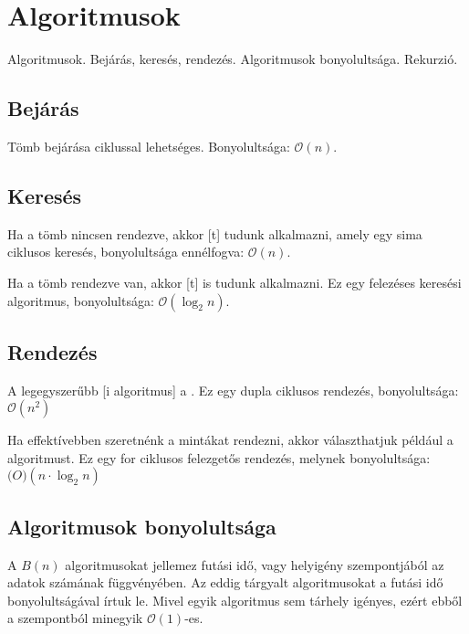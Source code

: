 \documentclass[../../main.tex]{subfiles}
\begin{document}
\section{Algoritmusok}

\begin{fulltheorem}
  Algoritmusok. Bejárás, keresés, rendezés.
  Algoritmusok bonyolultsága. Rekurzió.
\end{fulltheorem}

\subsection{Bejárás}

Tömb bejárása  ciklussal lehetséges. Bonyolultsága: $\mathcal{O}(n)$.

\subsection{Keresés}

Ha a tömb nincsen rendezve, akkor [t] tudunk
alkalmazni, amely egy sima  ciklusos keresés, bonyolultsága
ennélfogva: $\mathcal{O}(n)$.

Ha a tömb rendezve van, akkor [t] is tudunk alkalmazni.
Ez egy felezéses keresési algoritmus, bonyolultsága: $\mathcal{O}(\log_2n)$.

\subsection{Rendezés}

A legegyszerűbb [i algoritmus] a .
Ez egy dupla  ciklusos rendezés, bonyolultsága: $\mathcal{O}(n^2)$

Ha effektívebben szeretnénk a mintákat rendezni, akkor választhatjuk
például a  algoritmust. Ez egy for ciklusos felezgetős
rendezés, melynek bonyolultsága: $\mathcal(O)(n \cdot \log_2n)$

\subsection{Algoritmusok bonyolultsága}

A $B(n)$  algoritmusokat jellemez futási idő, vagy
helyigény szempontjából az adatok számának függvényében. Az eddig tárgyalt
algoritmusokat a futási idő bonyolultságával írtuk le. Mivel egyik
algoritmus sem tárhely igényes, ezért ebből a szempontból minegyik
$\mathcal{O}(1)$-es.
\end{document}
